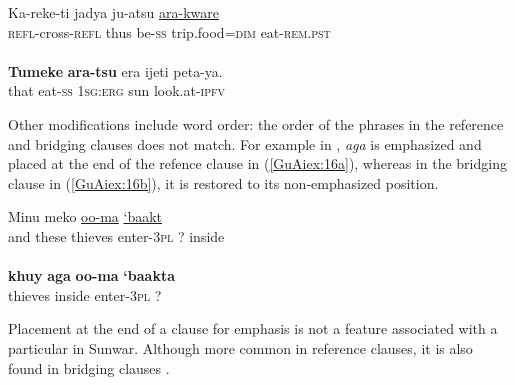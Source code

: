 \documentclass[output=paper]{LSP/langsci}
\begin{document}
\begin{exe}
\ex \label{GuAiex:15ab}
\begin{xlist}
\ex \label{GuAiex:15a}
\gll Ka-reke-ti      jadya   ju-atsu   \underline{}   \underline{ara-kware}\\
\textsc{refl}-cross-\textsc{refl}   thus   be-\textsc{ss}     trip.food=\textsc{dim}   eat-\textsc{rem.pst}\\
\glt {} \\

\pagebreak
\ex \label{GuAiex:15b}
\gll \textbf{Tumeke} \textbf{ara-tsu} era     ijeti   peta-ya. \\
that     eat-\textsc{ss}     \textsc{1sg:erg}   sun   look.at-\textsc{ipfv}  \\
\glt {}
\end{xlist}
\end{exe}


Other modifications include word order: the order of the phrases in the reference and bridging clauses does not match. For example in , \textit{aga} is emphasized and placed at the end of the refence clause in (\ref{GuAiex:16a}), whereas in the bridging clause in (\ref{GuAiex:16b}), it is restored to its non-emphasized position.


\begin{exe}
\ex \label{GuAiex:16ab}
\begin{xlist}
\ex \label{GuAiex:16a}
\gll Minu   meko  \underline{}     \underline{oo-ma}     \underline{‘baakt}   \underline{}\\
and   these   thieves   enter-\textsc{3pl}   ?  inside\\
\glt {} \\
\ex \label{GuAiex:16b}
\gll \textbf{khuy}     \textbf{aga}     \textbf{oo-ma }    \textbf{‘baakta} \\
thieves   inside     enter-\textsc{3pl}   ? \\
\glt {}
\end{xlist}
\end{exe}

\noindent
Placement at the end of a clause for emphasis is not a feature associated with a particular  in Sunwar. Although more common in reference clauses, it is also found in bridging clauses \citep[][391]{schulze73}. 
\end{document}
